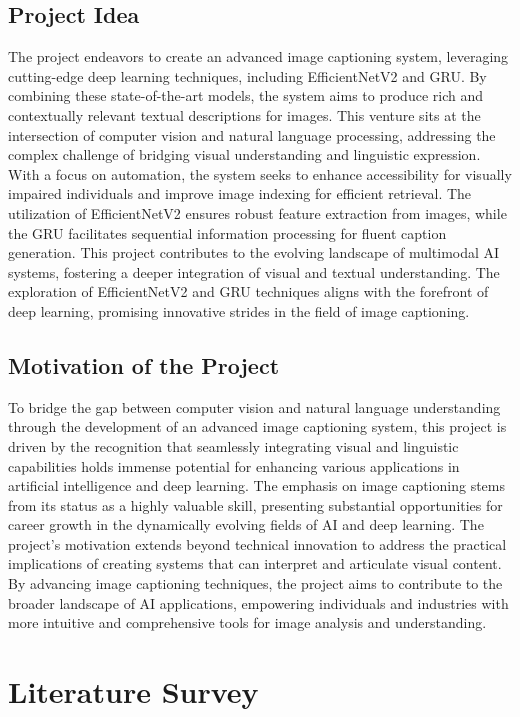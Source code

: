 \documentclass[oneside,a4paper,12pt]{report}
\begin{document}
\section{Project Idea}
The project endeavors to create an advanced image captioning system, leveraging cutting-edge deep learning techniques, including EfficientNetV2 and GRU. By combining these state-of-the-art models, the system aims to produce rich and contextually relevant textual descriptions for images. This venture sits at the intersection of computer vision and natural language processing, addressing the complex challenge of bridging visual understanding and linguistic expression. With a focus on automation, the system seeks to enhance accessibility for visually impaired individuals and improve image indexing for efficient retrieval. The utilization of EfficientNetV2 ensures robust feature extraction from images, while the GRU facilitates sequential information processing for fluent caption generation. This project contributes to the evolving landscape of multimodal AI systems, fostering a deeper integration of visual and textual understanding. The exploration of EfficientNetV2 and GRU techniques aligns with the forefront of deep learning, promising innovative strides in the field of image captioning.
\section{Motivation of the Project}  
To bridge the gap between computer vision and natural language understanding through the development of an advanced image captioning system, this project is driven by the recognition that seamlessly integrating visual and linguistic capabilities holds immense potential for enhancing various applications in artificial intelligence and deep learning. The emphasis on image captioning stems from its status as a highly valuable skill, presenting substantial opportunities for career growth in the dynamically evolving fields of AI and deep learning. The project's motivation extends beyond technical innovation to address the practical implications of creating systems that can interpret and articulate visual content. By advancing image captioning techniques, the project aims to contribute to the broader landscape of AI applications, empowering individuals and industries with more intuitive and comprehensive tools for image analysis and understanding.


\chapter{Literature Survey}
\end{document}
